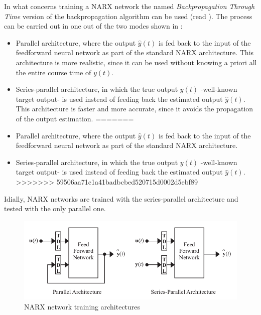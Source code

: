 
In what concerns training a NARX network the
named \emph{Backpropagation Through Time} version of the
backpropagation algorithm can be used (read ). The
process can be carried out in one out of the two modes shown
in  \cite{menezes2008long}:
\begin{itemize}
<<<<<<< HEAD
	\item Parallel architecture, 
	where the output $\hat{y}(t)$ is fed back to the input of the feedforward neural network as part of the standard NARX architecture. This architecture is more realistic, since it can be used without knowing a priori all the entire course time of $y(t)$. 
	\item Series-parallel architecture,  
	in which the true output $y(t)$ -well-known target output- is used instead of feeding back the estimated output $\hat{y}(t)$. This architecture is faster and more accurate, since it avoids the propagation of the output estimation.
=======
	\item Parallel architecture, where the output $\hat{y}(t)$ is
	fed back to the input of the feedforward neural network as
	part of the standard NARX architecture.  

        \item Series-parallel architecture, in which the true output
	$y(t)$ -well-known target output- is used instead of feeding
	back the estimated output $\hat{y}(t)$.
>>>>>>> 59506aa71c1a41badbcbed520715d0002d5ebf89
\end{itemize}

Idially, NARX networks are trained with the series-parallel architecture and tested with the only parallel one.

\begin{figure}[!ht]
\centering
\includegraphics[width=\textwidth]{images/narxTrainingArchitectures.png}
\caption{NARX network training architectures}
\label{fig:narxtrainingarch}
\end{figure}



